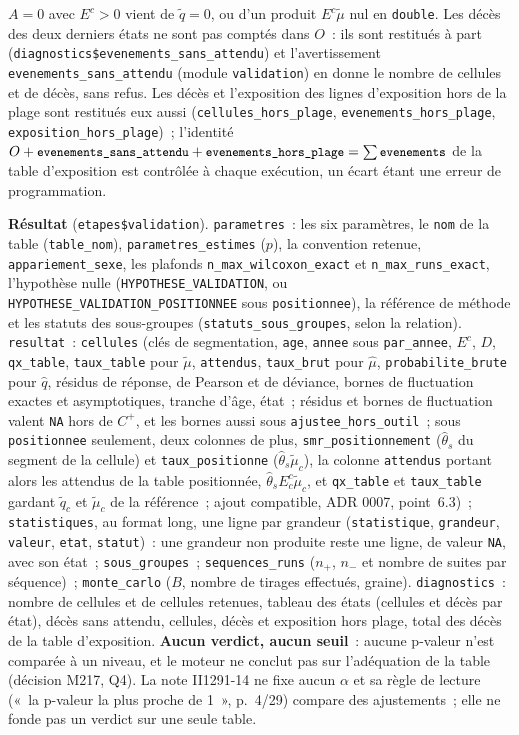 \documentclass[a4paper,11pt]{article}
\newcommand{\code}[1]{\texttt{\small #1}}
\begin{document}
\noindent
$A = 0$ avec $E^c > 0$ vient de $\tilde q = 0$, ou d'un produit $E^c
\tilde\mu$ nul en \code{double}. Les décès des deux derniers états ne sont
pas comptés dans $O$~: ils sont restitués à part
(\code{diagnostics\$evenements\_sans\_attendu}) et l'avertissement
\code{evenements\_sans\_attendu} (module \code{validation}) en donne le
nombre de cellules et de décès, sans refus. Les décès et l'exposition des
lignes d'exposition hors de la plage sont restitués eux aussi
(\code{cellules\_hors\_plage}, \code{evenements\_hors\_plage},
\code{exposition\_hors\_plage})~; l'identité $O +
\text{\code{evenements\_sans\_attendu}} +
\text{\code{evenements\_hors\_plage}} = \sum \text{\code{evenements}}$ de
la table d'exposition est contrôlée à chaque exécution, un écart étant une
erreur de programmation.

\medskip
{\sloppy\textbf{Résultat} (\code{etapes\$validation}). \code{parametres}~: les six
paramètres, le \code{nom} de la table (\code{table\_nom}),
\code{parametres\_estimes} ($p$), la convention retenue,
\code{appariement\_sexe}, les plafonds \code{n\_max\_wilcoxon\_exact} et
\code{n\_max\_runs\_exact}, l'hypothèse nulle
(\code{HYPOTHESE\_VALIDATION}, ou \code{HYPOTHESE\_VALIDATION\_POSITIONNEE}
sous \code{positionnee}), la référence de méthode et les statuts des
sous-groupes (\code{statuts\_sous\_groupes}, selon la relation). \code{resultat}~:
\code{cellules} (clés de segmentation, \code{age}, \code{annee} sous
\code{par\_annee}, $E^c$, $D$, \code{qx\_table}, \code{taux\_table} pour
$\tilde\mu$, \code{attendus}, \code{taux\_brut} pour $\hat\mu$,
\code{probabilite\_brute} pour $\hat q$, résidus de réponse, de Pearson et
de déviance, bornes de fluctuation exactes et asymptotiques, tranche d'âge,
état~; résidus et bornes de fluctuation valent \code{NA} hors de $C^{+}$,
et les bornes aussi sous \code{ajustee\_hors\_outil}~; sous
\code{positionnee} seulement, deux colonnes de plus,
\code{smr\_positionnement} ($\hat\theta_s$ du segment de la cellule) et
\code{taux\_positionne} ($\hat\theta_s \tilde\mu_c$), la colonne
\code{attendus} portant alors les attendus de la table positionnée,
$\hat\theta_s E^c_c \tilde\mu_c$, et \code{qx\_table} et
\code{taux\_table} gardant $\tilde q_c$ et $\tilde\mu_c$ de la
référence~; ajout compatible, ADR 0007,
point~6.3)~;
\code{statistiques}, au format long, une ligne par grandeur
(\code{statistique}, \code{grandeur}, \code{valeur}, \code{etat},
\code{statut})~: une grandeur non produite reste une ligne, de valeur
\code{NA}, avec son état~; \code{sous\_groupes}~;
\code{sequences\_runs} ($n_{+}$, $n_{-}$ et nombre de suites par
séquence)~; \code{monte\_carlo} ($B$, nombre de tirages effectués, graine).
\code{diagnostics}~: nombre de cellules et de cellules retenues, tableau
des états (cellules et décès par état), décès sans attendu, cellules, décès
et exposition hors plage, total des décès de la table d'exposition.
\textbf{Aucun verdict, aucun seuil}~: aucune p-valeur n'est comparée à un
niveau, et le moteur ne conclut pas sur l'adéquation de la table (décision
M217, Q4). La note II1291-14 ne fixe aucun $\alpha$ et sa règle de lecture
(«~la p-valeur la plus proche de 1~», p.~4/29) compare des ajustements~;
elle ne fonde pas un verdict sur une seule table.\par}
\end{document}
